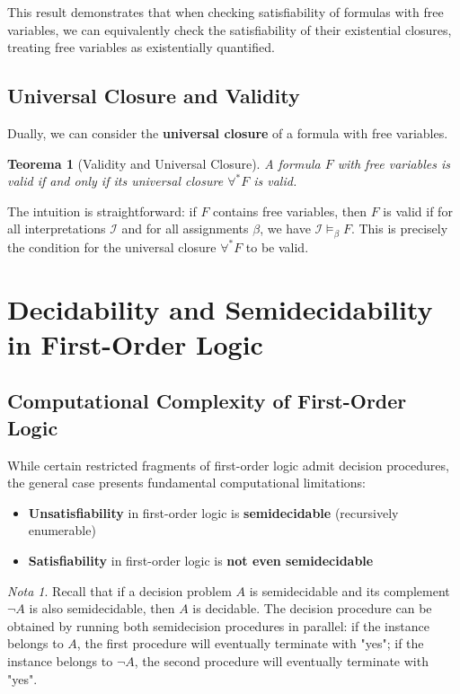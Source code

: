 \documentclass[11pt,a4paper]{article}
\theoremstyle{definition}
\theoremstyle{plain}
\newtheorem{theorem}{Teorema}[section]
\theoremstyle{remark}
\newtheorem*{remark}{Nota}
\begin{document}
This result demonstrates that when checking satisfiability of formulas with free variables, we can equivalently check the satisfiability of their existential closures, treating free variables as existentially quantified.

\subsection{Universal Closure and Validity}

Dually, we can consider the \textbf{universal closure} of a formula with free variables.

\begin{theorem}[Validity and Universal Closure]
A formula $F$ with free variables is valid if and only if its universal closure $\forall^* F$ is valid.
\end{theorem}

The intuition is straightforward: if $F$ contains free variables, then $F$ is valid if for all interpretations $\mathcal{I}$ and for all assignments $\beta$, we have $\mathcal{I} \models_\beta F$. This is precisely the condition for the universal closure $\forall^* F$ to be valid.

\newpage

\section{Decidability and Semidecidability in First-Order Logic}

\subsection{Computational Complexity of First-Order Logic}

While certain restricted fragments of first-order logic admit decision procedures, the general case presents fundamental computational limitations:

\begin{itemize}
    \item \textbf{Unsatisfiability} in first-order logic is \textbf{semidecidable} (recursively enumerable)
    \item \textbf{Satisfiability} in first-order logic is \textbf{not even semidecidable}
\end{itemize}

\begin{remark}
Recall that if a decision problem $A$ is semidecidable and its complement $\neg A$ is also semidecidable, then $A$ is decidable. The decision procedure can be obtained by running both semidecision procedures in parallel: if the instance belongs to $A$, the first procedure will eventually terminate with "yes"; if the instance belongs to $\neg A$, the second procedure will eventually terminate with "yes".
\end{remark}
\end{document}
